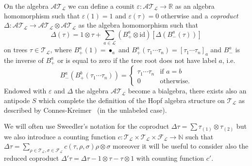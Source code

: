 \documentclass[a4paper]{article}
\newcommand{\1}{{\bf 1}}
\newcommand{\eps}{\varepsilon}
\newcommand{\RR}{\mathbb{R}}
\newcommand{\NN}{\mathbb{N}}
\newcommand{\FF}{\mathcal{F}}
\newcommand{\LL}{\mathcal{L}}
\newcommand{\cl}{\mathcal L}
\newcommand{\TT}{\mathcal{T}}
\newcommand{\cA}{\mathcal{A}}
\newcommand{\troot}{\bullet}
\newcommand{\RR}{\mathbb{R}}
\newcommand{\eps}{\varepsilon}
\begin{document}
On the algebra $\cA \TT_\cl$ we can define a counit $\eps: \cA
\TT_\cl \to \RR$ as an algebra homomorphism such that $\eps(1) = 1$
and $\eps(\tau) = 0$ otherwise and a \emph{coproduct} $\Delta :
\cA\TT_\cl \to \cA\TT_\cl \otimes \cA\TT_\cl$ as the algebra
homomorphism
such that
\begin{equation}
  \label{eq:delta-def}
\Delta(\tau) = 1\otimes \tau  + \sum_{a \in \cl} (B^a_+ \otimes \text{id} )[\Delta(B^a_-(\tau))] 
\end{equation}
on trees $\tau \in \TT_\LL$,
where $B_+^a(1) = \troot_a$ and $B_+^a(\tau_1 \cdots \tau_n) = [\tau_1 \cdots \tau_n]_a$ and
$B_-^a$ is the inverse of $B_+^a$ or is equal to zero if the tree
root does not have label $a$, i.e. 
\begin{equation*}
B_-^a(B^b_+(\tau_1 \cdots \tau_n))= \begin{cases}
 \tau_1 \cdots \tau_n & \text{if $a=b$}\\
0 & \text{otherwise.}
\end{cases}
\end{equation*}
%
Endowed with $\eps$ and $\Delta$ the algebra $\cA \TT_\cl$ become a
bialgebra, there exists also an antipode $S$ which complete the
definition of the Hopf algebra structure on $\TT_\cl$ as described by
Connes-Kreimer~\cite{MR1660199} (in the unlabeled case). 

We will often use Sweedler's notation for the coproduct $\Delta \tau = \sum \tau_{(1)} \otimes \tau_{(2)}$ but we also introduce a counting function $c : \TT_\cl \times \TT_\cl \times \FF_\cl \to \NN$ such that
$
\Delta \tau = \sum_{\rho \in \TT_\cl, \sigma \in \FF_\cl} c(\tau,\rho, \sigma) \rho \otimes \sigma
$
moreover it will be useful to consider also the reduced coproduct
$\Delta' \tau = \Delta \tau - 1 \otimes \tau - \tau \otimes 1$ with
counting function $c'$.
\end{document}
